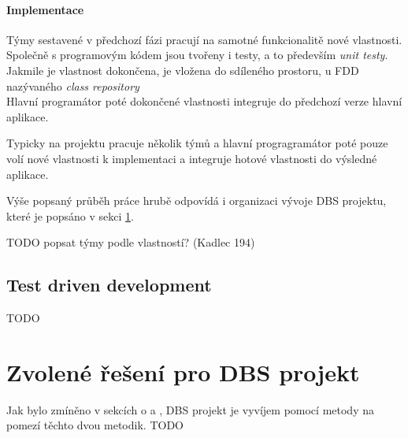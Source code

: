 \paragraph{Implementace}
Týmy sestavené v předchozí fázi pracují na samotné funkcionalitě nové vlastnosti. Společně s programovým kódem jsou tvořeny i testy, a to především \emph{unit testy}.\\
Jakmile je vlastnost dokončena, je vložena do sdíleného prostoru, u FDD nazývaného \emph{class repository}\\
Hlavní programátor poté dokončené vlastnosti integruje do předchozí verze hlavní aplikace.

Typicky na projektu pracuje několik týmů a hlavní progragramátor poté pouze volí nové vlastnosti k implementaci a integruje hotové vlastnosti do výsledné aplikace.

Výše popsaný průběh práce hrubě odpovídá i organizaci vývoje DBS projektu, které je popsáno v sekci \ref{methods:dbs}.

TODO popsat týmy podle vlastností? (Kadlec 194)

\subsection{Test driven development} \label{methods:tdd}

TODO



\section{Zvolené řešení pro DBS projekt} \label{methods:dbs}

Jak bylo zmíněno v sekcích o \emph{} a \emph{}, DBS projekt je vyvíjem pomocí metody na pomezí těchto dvou metodik.
TODO
